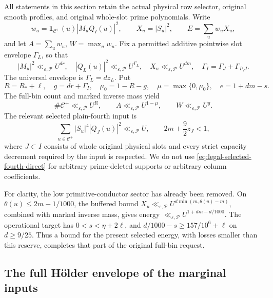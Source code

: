 \documentclass[11pt]{article}
\theoremstyle{definition}
\newcommand{\eps}{\varepsilon}
\newcommand{\Id}{\mathbf 1}
\newcommand{\Cplus}{\mathcal C^+}
\newcommand{\lls}{\ll_{\eps,\mathcal P}}
\begin{document}
All statements in this section retain the actual physical row selector,
original smooth profiles, and original whole-slot prime polynomials.
Write
\[
 w_u=\Id_{\Cplus}(u)|M_uQ_I(u)|^2,\qquad
 X_u=|S_u|^2,\qquad E=\sum_u w_uX_u,
\]
and let \(A=\sum_u w_u\), \(W=\max_u w_u\).  Fix a permitted
additive pointwise slot envelope \(\Gamma_L\), so that
\[
 |M_u|^2\lls U^{dr},\quad |Q_L(u)|^2\lls U^{\Gamma_L},
 \quad X_u\lls U^{dm},\quad
 \Gamma_I=\Gamma_J+\Gamma_{I\setminus J}.
\]
The universal envelope is \(\Gamma_L=dz_L\).  Put
\begin{equation}
 R=R_*+\ell,\quad g=dr+\Gamma_I,\quad
 \mu_0=1-R-g,\quad \mu=\max\{0,\mu_0\},\quad
 e=1+dm-s.
 \label{eq:direct-budget-definitions}
\end{equation}
The full-bin count and marked inverse mass yield
\begin{equation}
 \#\Cplus\lls U^R,\qquad
 A\lls U^{1-\mu},\qquad W\lls U^g.
 \label{eq:mass-and-maximum-direct}
\end{equation}
The relevant selected plain-fourth input is
\begin{equation}
 \sum_{u\in\Cplus}|S_u|^4|Q_J(u)|^2\lls U,
 \qquad 2m+\frac92z_J<1,
 \label{eq:legal-selected-fourth-direct}
\end{equation}
where \(J\subset I\) consists of whole original physical slots and
every strict capacity decrement required by the input is respected.
We do not use \eqref{eq:legal-selected-fourth-direct} for arbitrary
prime-deleted supports or arbitrary column coefficients.

For clarity, the low primitive-conductor sector has already been removed.
On \(\theta(u)\le2m-1/1000\), the buffered bound
\(X_u\lls U^{d\min(m,\theta(u)-m)}\), combined with marked inverse
mass, gives energy \(\lls U^{1+dm-d/1000}\).  The operational target
has \(0<s<\eta+2\ell\), and
\(d/1000-s\ge157/10^6+\ell\) on \(d\ge9/25\).
Thus a bound for the present selected energy, with losses smaller than
this reserve, completes that part of the original full-bin request.

\subsection{The full Hölder envelope of the marginal inputs}
\end{document}
